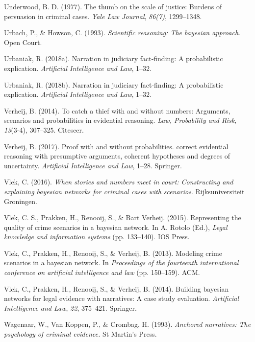 \documentclass[11pt,dvipsnames,enabledeprecatedfontcommands]{scrartcl}
\begin{document}
\hypertarget{ref-Underwood1977The-thumb-on-th}{}
Underwood, B. D. (1977). The thumb on the scale of justice: Burdens of
persuasion in criminal cases. \emph{Yale Law Journal}, \emph{86(7)},
1299--1348.

\hypertarget{ref-Urbach1993-HOWSRT}{}
Urbach, P., \& Howson, C. (1993). \emph{Scientific reasoning: The
bayesian approach}. Open Court.

\hypertarget{ref-urbaniak2018narration}{}
Urbaniak, R. (2018a). Narration in judiciary fact-finding: A
probabilistic explication. \emph{Artificial Intelligence and Law},
1--32.

\hypertarget{ref-Urbaniak2017Narration-in-ju}{}
Urbaniak, R. (2018b). Narration in judiciary fact-finding: A
probabilistic explication. \emph{Artificial Intelligence and Law},
1--32.

\hypertarget{ref-verheij2014catch}{}
Verheij, B. (2014). To catch a thief with and without numbers:
Arguments, scenarios and probabilities in evidential reasoning.
\emph{Law, Probability and Risk}, \emph{13}(3-4), 307--325. Citeseer.

\hypertarget{ref-verheijproof2017}{}
Verheij, B. (2017). Proof with and without probabilities. correct
evidential reasoning with presumptive arguments, coherent hypotheses and
degrees of uncertainty. \emph{Artificial Intelligence and Law}, 1--28.
Springer.

\hypertarget{ref-vlek2016stories}{}
Vlek, C. (2016). \emph{When stories and numbers meet in court:
Constructing and explaining bayesian networks for criminal cases with
scenarios}. Rijksuniversiteit Groningen.

\hypertarget{ref-vlek2015}{}
Vlek, C. S., Prakken, H., Renooij, S., \& Bart Verheij. (2015).
Representing the quality of crime scenarios in a bayesian network. In A.
Rotolo (Ed.), \emph{Legal knowledge and information systems} (pp.
133--140). IOS Press.

\hypertarget{ref-vlek2013modeling}{}
Vlek, C., Prakken, H., Renooij, S., \& Verheij, B. (2013). Modeling
crime scenarios in a bayesian network. In \emph{Proceedings of the
fourteenth international conference on artificial intelligence and law}
(pp. 150--159). ACM.

\hypertarget{ref-vlek2014building}{}
Vlek, C., Prakken, H., Renooij, S., \& Verheij, B. (2014). Building
bayesian networks for legal evidence with narratives: A case study
evaluation. \emph{Artificial Intelligence and Law}, \emph{22}, 375--421.
Springer.

\hypertarget{ref-wagenaar1993anchored}{}
Wagenaar, W., Van Koppen, P., \& Crombag, H. (1993). \emph{Anchored
narratives: The psychology of criminal evidence.} St Martin's Press.
\end{document}
